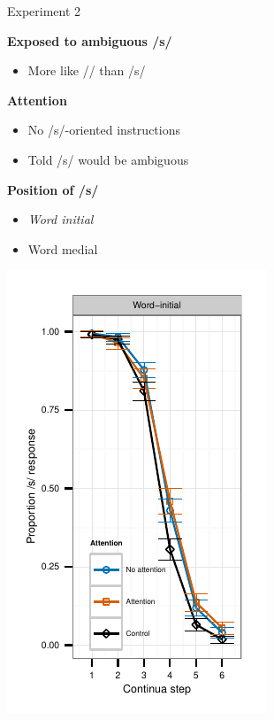 \documentclass{beamer}
\begin{document}
\begin{frame}{Experiment 2}

\begin{minipage}{0.45\textwidth}
\textbf{Exposed to ambiguous /s/}
\begin{itemize}
\item More like /\textesh/ than /s/
\end{itemize}

\textbf{Attention}
\begin{itemize}
\item No /s/-oriented instructions
\item Told /s/ would be ambiguous
\end{itemize}

\textbf{Position of /s/}
\begin{itemize}
\item \emph{Word initial}
\item Word medial
\end{itemize}
\end{minipage}
\hfill
\begin{minipage}{0.45\textwidth}
\includegraphics{graphs/exp2_categresults_present2-initial}
\end{minipage}

\end{frame}
\end{document}
